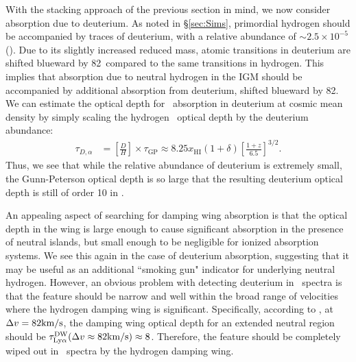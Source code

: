 With the stacking approach of the previous section in mind, we now consider absorption due to deuterium. As noted in \S\ref{sec:Sims}, primordial hydrogen should be accompanied by traces of deuterium, with a relative abundance of $\sim 2.5\times 10^{-5}$ (\citealt{Cooke:2013cba}). Due to its slightly increased reduced mass, atomic transitions in deuterium are shifted blueward by 82\kms\ compared to the same transitions in hydrogen. This implies that absorption due to neutral hydrogen in the IGM should be accompanied by additional absorption from deuterium, shifted blueward by 82\kms. We can estimate the optical depth for \lya\ absorption in deuterium at cosmic mean density by simply scaling the hydrogen \lya\ optical depth by the deuterium abundance:
\begin{align}
\tau_{D,\alpha} &= \left[ \frac{D}{H} \right]  \times \tau_{\text{GP}} \approx 8.25 x_{\text{HI}} \left(1+\delta\right)  \left[ \frac{1+z}{6.5} \right]^{3/2}.
\end{align}
Thus, we see that while the relative abundance of deuterium is extremely small, the Gunn-Peterson optical depth is so large that the resulting deuterium optical depth is still of order 10 in \lya.


An appealing aspect of searching for damping wing absorption is that the optical depth in the wing is large enough to cause significant absorption in the presence of neutral islands, but small enough to be negligible for ionized absorption systems. We see this again in the case of deuterium absorption, suggesting that it may be useful as an additional ``smoking gun" indicator for underlying neutral hydrogen. However, an obvious problem with detecting deuterium in \lya\ spectra is that the feature should be narrow and well within the broad range of velocities where the hydrogen damping wing is significant. Specifically, according to , at $\Delta v = 82\text{km}/\text{s}$, the damping wing optical depth for an extended neutral region should be $\tau_{\text{Ly}\alpha}^{\text{DW}}(\Delta v \approx 82\text{km}/\text{s}) \approx 8$. Therefore, the feature should be completely wiped out in \lya\ spectra by the hydrogen damping wing.


